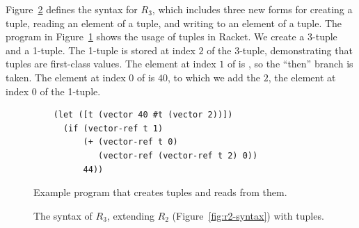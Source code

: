 \documentclass[11pt]{book}
\newcommand{\gray}[1]{{\color{lightgray} #1}}
\begin{document}
Figure~\ref{fig:r3-syntax} defines the syntax for $R_3$, which
includes three new forms for creating a tuple, reading an element of a
tuple, and writing to an element of a tuple. The program in
Figure~\ref{fig:vector-eg} shows the usage of tuples in Racket. We
create a 3-tuple  and a 1-tuple. The 1-tuple is stored at
index $2$ of the 3-tuple, demonstrating that tuples are first-class
values.  The element at index $1$ of  is , so the
``then'' branch is taken.  The element at index $0$ of  is
$40$, to which we add the $2$, the element at index $0$ of the
1-tuple.

\begin{figure}[tbp]
\begin{lstlisting}
    (let ([t (vector 40 #t (vector 2))])
      (if (vector-ref t 1)
          (+ (vector-ref t 0)
             (vector-ref (vector-ref t 2) 0))
          44))
\end{lstlisting}
\caption{Example program that creates tuples and reads from them.}
\label{fig:vector-eg}
\end{figure}

\begin{figure}[tbp]
\centering
\fbox{
\begin{minipage}{0.96\textwidth}
\[
\begin{array}{lcl}
  \Type &::=& \gray{\key{Integer} \mid \key{Boolean}}
  \mid (\key{Vector}\;\Type^{+}) \mid \key{Void}\\
  \itm{cmp} &::= & \gray{  \key{eq?} \mid \key{<} \mid \key{<=} \mid \key{>} \mid \key{>=}  } \\
  \Exp &::=& \gray{  \Int \mid (\key{read}) \mid (\key{-}\;\Exp) \mid (\key{+} \; \Exp\;\Exp) \mid (\key{-}\;\Exp\;\Exp) }  \\
  &\mid&  \gray{  \Var \mid \LET{\Var}{\Exp}{\Exp}  }\\
  &\mid& \gray{ \key{\#t} \mid \key{\#f} 
   \mid (\key{and}\;\Exp\;\Exp) 
   \mid (\key{or}\;\Exp\;\Exp)
   \mid (\key{not}\;\Exp) } \\
  &\mid& \gray{  (\itm{cmp}\;\Exp\;\Exp) 
   \mid \IF{\Exp}{\Exp}{\Exp}  } \\
  &\mid& (\key{vector}\;\Exp^{+}) 
   \mid (\key{vector-ref}\;\Exp\;\Int) \\
  &\mid& (\key{vector-set!}\;\Exp\;\Int\;\Exp)\\
  &\mid& (\key{void}) \\
  R_3 &::=& (\key{program} \; \Exp)
\end{array}
\]
\end{minipage}
}
\caption{The syntax of $R_3$, extending $R_2$
  (Figure~\ref{fig:r2-syntax}) with tuples.}
\label{fig:r3-syntax}
\end{figure}
\end{document}
